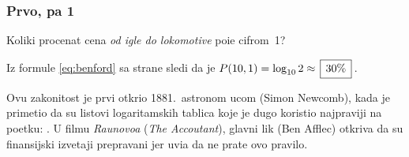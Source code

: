 \subsubsection{Prvo, pa 1}

\def\fibonacci#1#2#3{%
\newcount\a \a=#1
\newcount\b \b=#2
\number\a,~\number\b
\newcount\t
\newcount\n \n=#3 \advance\n-2
\loop
  \t=\b \advance\b\a \a=\t
  , \number\b
  \advance\n-1
\ifnum \n>0 \repeat}

\zadatak 
Koliki procenat cena {\sl od igle do lokomotive\/}
po{\cv}i{\nj}e cifrom~1?

\resenje Iz formule \eqref{eq:benford} sa strane \pageref{eq:benford} sledi da je $P(10,1)=\logten 2 \approx \ram{30\%}$.

\dodatak Ovu zakonitost je prvi otkrio 1881.\ astronom {\Nj}ucom (Simon Newcomb), kada je primetio da su
listovi logaritamskih tablica koje je dugo koristio najpr{\lj}aviji
na po{\cv}etku: .
U filmu {\sl Ra{\cv}unovo{\dj}a\/} ({\sl The Accoutant\/}), glavni lik (Ben Afflec) otkriva
da su finansijski izve{\sv}taji preprav{\lj}ani jer uvi{\dj}a da
ne prate ovo pravilo.